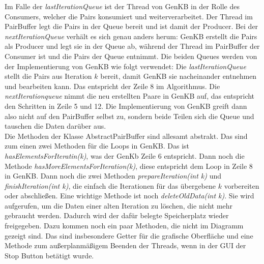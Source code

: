 \documentclass[12pt,a4paper]{article}
\begin{document}
Im Falle der \textit{lastIterationQueue} ist der Thread von GenKB in der Rolle des Consumers, welcher die Pairs konsumiert und weiterverarbeitet. Der Thread im PairBuffer legt die Pairs in der Queue bereit und ist damit der Producer. Bei der \textit{nextIterationQueue} verhält es sich genau anders herum: GenKB erstellt die Pairs als Producer und legt sie in der Queue ab, während der Thread im PairBuffer der Consumer ist und die Pairs der Queue entnimmt. Die beiden Queues werden von der Implementierung von GenKB wie folgt verwendet: Die \textit{lastIterationQueue} stellt die Pairs aus Iteration $k$ bereit, damit GenKB sie nacheinander entnehmen und bearbeiten kann. Das entspricht der Zeile 8 im Algorithmus. Die \textit{nextIterationqueue} nimmt die neu erstellten Paare in GenKB auf, das entspricht den Schritten in Zeile 5 und 12. Die Implementierung von GenKB greift dann also nicht auf den PairBuffer selbst zu, sondern beide Teilen sich die Queue und tauschen die Daten darüber aus. \\
Die Methoden der Klasse AbstractPairBuffer sind allesamt abstrakt. Das sind zum einen zwei Methoden für die Loops in GenKB. Das ist \textit{hasElementsForIteratin(k)}, was der GenKb Zeile 6 entspricht. Dann noch die Methode \textit{hasMoreElementsForIteration(k)}, diese entspricht dem Loop in Zeile 8 in GenKB. Dann noch die zwei Methoden \textit{prepareIteration(int k)} und \textit{finishIteration(int k)}, die einfach die Iterationen für das übergebene $k$ vorbereiten oder abschließen. Eine wichtige Methode ist noch \textit{deleteOldData(int k)}. Sie wird aufgerufen, um die Daten einer alten Iteration zu löschen, die nicht mehr gebraucht werden. Dadurch wird der dafür belegte Speicherplatz wieder freigegeben. Dazu kommen noch ein paar Methoden, die nicht im Diagramm gezeigt sind. Das sind insbesondere Getter für die grafische Oberfläche und eine Methode zum außerplanmäßigem Beenden der Threads, wenn in der GUI der Stop Button betätigt wurde.
\end{document}
